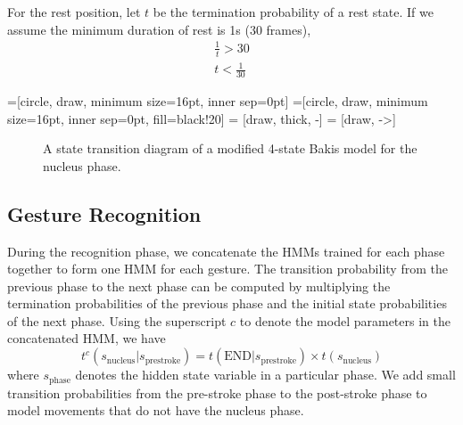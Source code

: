 For the rest position, let $t$ be the termination probability of a rest state.
If we assume the minimum duration of rest is 1s (30 frames), 
\begin{align}
\frac{1}{t} > 30 \\
t < \frac{1}{30}
\end{align}

=[circle, draw, minimum size=16pt, inner sep=0pt]
=[circle, draw, minimum size=16pt, inner
sep=0pt, fill=black!20] 
 = [draw, thick, -]
 = [draw, ->]

\begin{figure}[tb]
\centering
  \caption{A state transition diagram of a modified 4-state Bakis model for the nucleus phase.}
  \label{fig:bakis}
\end{figure}

\subsection{Gesture Recognition}
During the recognition phase, we concatenate the HMMs trained for each phase together to form
one HMM for each gesture. The transition probability from the previous phase to the next
phase can be computed by multiplying the termination probabilities of the previous phase and the
initial state probabilities of the next phase. Using the superscript $c$ to denote the model
parameters in the concatenated HMM, we have
\begin{displaymath}
t^c(s_\text{nucleus}|s_\text{prestroke}) = t(\text{END}|s_\text{prestroke}) \times t(s_\text{nucleus})
\end{displaymath}
where $s_{\text{phase}}$ denotes the hidden state variable in a particular phase. We add small transition
probabilities from the pre-stroke phase to the post-stroke phase to model movements that do not have the 
nucleus phase.

